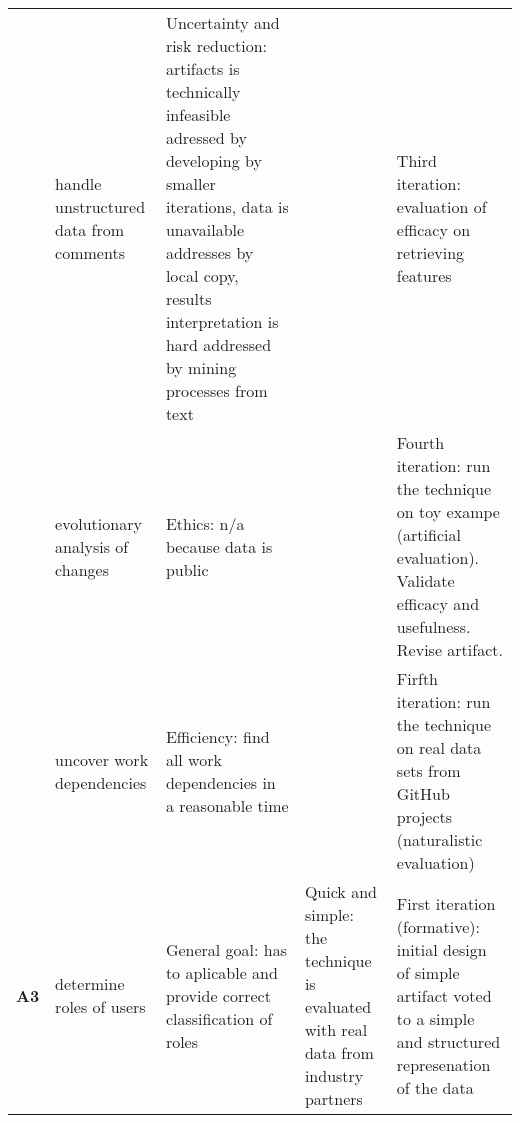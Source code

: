 \begin{longtable}[c]{@{}p{1cm}p{2.5cm}p{5cm}p{3cm}p{4cm}@{}}
                  & handle unstructured data from comments         & Uncertainty and risk reduction: artifacts is technically infeasible adressed by developing by smaller iterations, data is unavailable addresses by local copy, results interpretation is hard addressed by mining processes from text                                    &                                                                                                                                                      & Third iteration: evaluation of efficacy on retrieving features                                                                \\
                  & evolutionary analysis of changes               & Ethics: n/a because data is public                                                                                                                                                                                                                                       &                                                                                                                                                      & Fourth iteration: run the technique on toy exampe (artificial evaluation). Validate efficacy and usefulness. Revise artifact. \\
                  & uncover work dependencies                      & Efficiency: find all work dependencies in a reasonable time                                                                                                                                                                                                              &                                                                                                                                                      & Firfth iteration: run the technique on real data sets from GitHub projects (naturalistic evaluation)                          \\* \midrule
\textbf{A3}       & determine roles of users                       & General goal: has to aplicable and provide correct classification of roles                                                                                                                                                                                               & Quick and simple: the technique is evaluated with real data from industry partners                                                                   & First iteration (formative): initial design of simple artifact voted to a simple and structured represenation of the data     \\

\end{longtable}
